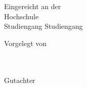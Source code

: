 \begin{titlepage}
\begin{center}
\vspace{1em}

Eingereicht an der \\
Hochschule\\
Studiengang Studiengang

\vspace{1em}

Vorgelegt von\\
\autor \\
\personalnummer \\

\vspace{1em}

Gutachter \\
\betreuer 

\vspace{1.5em}

\abgabedat


\end{center}
\end{titlepage}